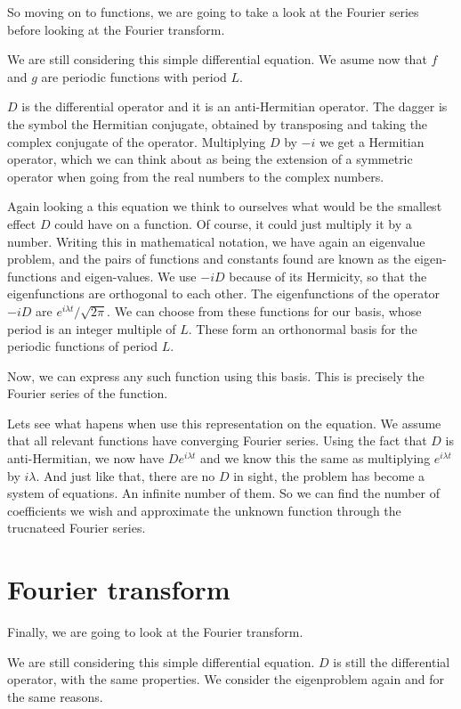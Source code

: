 \documentclass{article}
\newcounter{problem}[section]\setcounter{problem}{1}
\begin{document}
So moving on to functions, we are going to take a look at the Fourier series before looking at the Fourier transform.

We are still considering this simple differential equation.
We asume now that $f$ and $g$ are periodic functions with period $L$.

$D$ is the differential operator and it is an anti-Hermitian operator.
The dagger is the symbol the Hermitian conjugate, obtained by transposing and taking the complex conjugate of the operator.
Multiplying $D$ by $-i$ we get a Hermitian operator, which we can think about as being the extension of a symmetric operator when going from the real numbers to the complex numbers.

Again looking a this equation we think to ourselves what would be the smallest effect $D$ could have on a function.
Of course, it could just multiply it by a number.
Writing this in mathematical notation, we have again an eigenvalue problem, and the pairs of functions and constants found are known as the eigen-functions and eigen-values.
We use $-iD$ because of its Hermicity, so that the eigenfunctions are orthogonal to each other.
The eigenfunctions of the operator $-iD$ are $e^{i\lambda t}/\sqrt{2\pi}$.
We can choose from these functions for our basis, whose period is an integer multiple of $L$.
These form an orthonormal basis for the periodic functions of period $L$.

Now, we can express any such function using this basis.
This is precisely the Fourier series of the function.

Lets see what hapens when use this representation on the equation.
We assume that all relevant functions have converging Fourier series.
Using the fact that $D$ is anti-Hermitian, we now have $D e^{i\lambda t}$ and we know this the same as multiplying $e^{i\lambda t}$ by $i\lambda$.
And just like that, there are no $D$ in sight, the problem has become a system of equations.
An infinite number of them.
So we can find the number of coefficients we wish and approximate the unknown function through the trucnateed Fourier series.

\section{Fourier transform}

Finally, we are going to look at the Fourier transform.

We are still considering this simple differential equation.
$D$ is still the differential operator, with the same properties.
We consider the eigenproblem again and for the same reasons.
\end{document}
